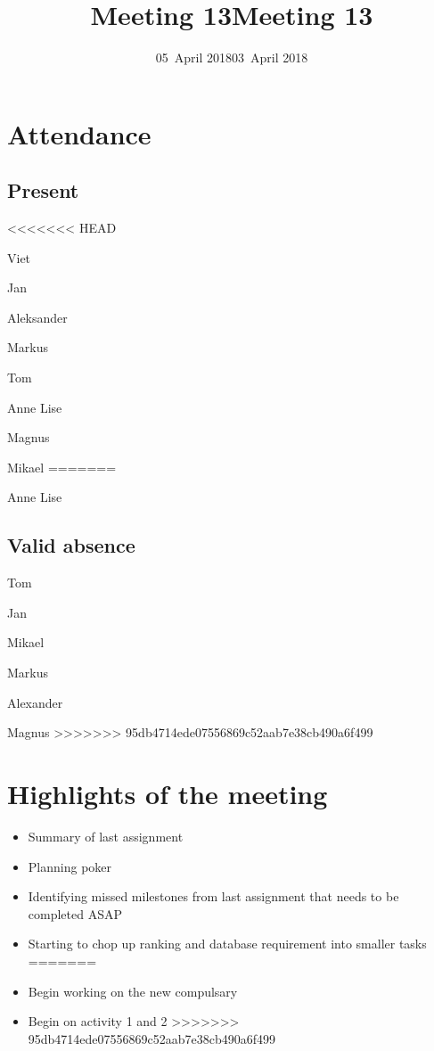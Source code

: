 \documentclass[letterpaper,11pt]{article}
\title{Meeting 13}
\date{05~April 2018}
\title{Meeting 13}
\date{03~April 2018}
\begin{document}
\maketitle
\section*{Attendance}
\subsection*{Present}
\begin{list}{}{}
<<<<<<< HEAD
	\item Viet
	\item Jan
	\item Aleksander
	\item Markus
	\item Tom
	\item Anne Lise
	\item Magnus
	\item Mikael
=======
	\item Anne Lise
\end{list}

\subsection*{Valid absence}
\begin{list}{}{}
	\item Tom
	\item Jan
	\item Mikael
	\item Markus
	\item Alexander
	\item Magnus
>>>>>>> 95db4714ede07556869c52aab7e38cb490a6f499
\end{list}

\newpage
\section*{Highlights of the meeting}
\begin{itemize}
<<<<<<< HEAD
	\item Summary of last assignment
	\item Planning poker
	\item Identifying missed milestones from last assignment that needs to be completed ASAP
	\item Starting to chop up ranking and database requirement into smaller tasks
=======
	\item Begin working on the new compulsary
	\item Begin on activity 1 and 2
>>>>>>> 95db4714ede07556869c52aab7e38cb490a6f499
\end{itemize}
\end{document}
